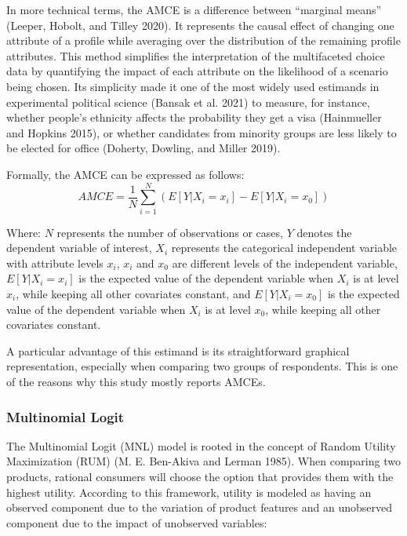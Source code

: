 \documentclass[
  12pt,
]{article}
\begin{document}
In more technical terms, the AMCE is a difference between ``marginal means'' (Leeper, Hobolt, and Tilley 2020). It represents the causal effect of changing one attribute of a profile while averaging over the distribution of the remaining profile attributes. This method simplifies the interpretation of the multifaceted choice data by quantifying the impact of each attribute on the likelihood of a scenario being chosen. Its simplicity made it one of the most widely used estimands in experimental political science (Bansak et al. 2021) to measure, for instance, whether people's ethnicity affects the probability they get a visa (Hainmueller and Hopkins 2015), or whether candidates from minority groups are less likely to be elected for office (Doherty, Dowling, and Miller 2019).

Formally, the AMCE can be expressed as follows:\[AMCE = \frac{1}{N} \sum_{i=1}^{N} (E[Y|X_i=x_i] - E[Y|X_i=x_0])\]

Where: \(N\) represents the number of observations or cases, \(Y\) denotes the dependent variable of interest, \(X_i\) represents the categorical independent variable with attribute levels \(x_i\), \(x_i\) and \(x_0\) are different levels of the independent variable, \(E[Y|X_i=x_i]\) is the expected value of the dependent variable when \(X_i\) is at level \(x_i\), while keeping all other covariates constant, and \(E[Y|X_i=x_0]\) is the expected value of the dependent variable when \(X_i\) is at level \(x_0\), while keeping all other covariates constant.

A particular advantage of this estimand is its straightforward graphical representation, especially when comparing two groups of respondents. This is one of the reasons why this study mostly reports AMCEs.

\hypertarget{multinomial-logit}{%
\subsubsection{Multinomial Logit}\label{multinomial-logit}}

The Multinomial Logit (MNL) model is rooted in the concept of Random Utility Maximization (RUM) (M. E. Ben-Akiva and Lerman 1985). When comparing two products, rational consumers will choose the option that provides them with the highest utility. According to this framework, utility is modeled as having an observed component due to the variation of product features and an unobserved component due to the impact of unobserved variables:
\end{document}
